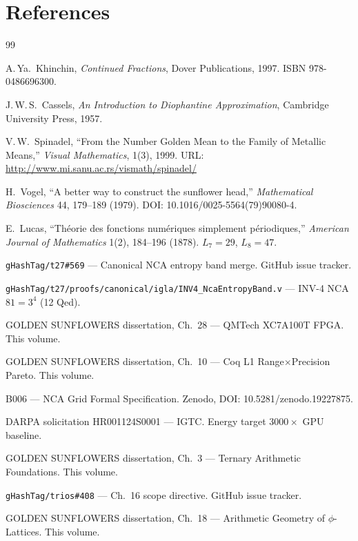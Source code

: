 \section{References}
\label{references}

\begin{thebibliography}{99}

A.\,Ya.\ Khinchin,
\textit{Continued Fractions},
Dover Publications, 1997.
ISBN 978-0486696300.
\cite{khinchin_continued_fractions}

J.\,W.\,S.\ Cassels,
\textit{An Introduction to Diophantine Approximation},
Cambridge University Press, 1957.
\cite{cassels_diophantine}

V.\,W.\ Spinadel,
``From the Number Golden Mean to the Family of Metallic Means,''
\textit{Visual Mathematics}, 1(3), 1999.
URL: \url{http://www.mi.sanu.ac.rs/vismath/spinadel/}
\cite{spinadel_metallic}

H.\ Vogel,
``A better way to construct the sunflower head,''
\textit{Mathematical Biosciences} 44, 179--189 (1979).
DOI: 10.1016/0025-5564(79)90080-4.

E.\ Lucas,
``Th\'eorie des fonctions num\'eriques simplement p\'eriodiques,''
\textit{American Journal of Mathematics} 1(2), 184--196 (1878).
$L_7=29$, $L_8=47$.

\end{thebibliography}

\noindent[3] \texttt{gHashTag/t27\#569} ---
Canonical NCA entropy band merge.  GitHub issue
tracker.

\noindent[6] \texttt{gHashTag/t27/proofs/canonical/igla/INV4\_NcaEntropyBand.v}
--- INV-4 NCA $81=3^4$ (12 Qed).

\noindent[7] GOLDEN SUNFLOWERS dissertation, Ch.~28 ---
QMTech XC7A100T FPGA\@. This volume.

\noindent[8] GOLDEN SUNFLOWERS dissertation, Ch.~10 ---
Coq L1 Range$\times$Precision Pareto.  This volume.

\noindent[9] B006 --- NCA Grid Formal Specification.
Zenodo, DOI: 10.5281/zenodo.19227875.

\noindent[10] DARPA solicitation HR001124S0001 ---
IGTC\@. Energy target $3000\times$ GPU baseline.

\noindent[11] GOLDEN SUNFLOWERS dissertation, Ch.~3 ---
Ternary Arithmetic Foundations.  This volume.

\noindent[12] \texttt{gHashTag/trios\#408} ---
Ch.~16 scope directive.  GitHub issue tracker.

\noindent[13] GOLDEN SUNFLOWERS dissertation, Ch.~18 ---
Arithmetic Geometry of $\phi$-Lattices.  This volume.


